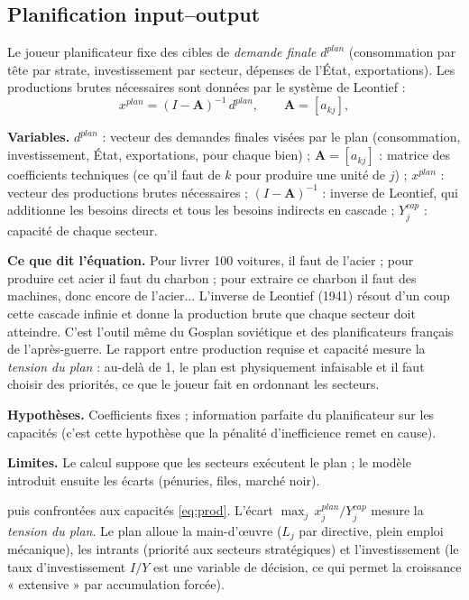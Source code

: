 \documentclass[11pt,a4paper]{article}
\newcommand{\og}{« }
\newcommand{\fg}{ »}
\newcommand{\variables}{\par\noindent\textbf{Variables.} }
\newcommand{\sens}{\par\noindent\textbf{Ce que dit l'équation.} }
\newcommand{\hyp}{\par\noindent\textbf{Hypothèses.} }
\newcommand{\limites}{\par\noindent\textbf{Limites.} }
\begin{document}
\subsection{Planification input--output}
\label{sec:plan}
Le joueur planificateur fixe des cibles de \emph{demande finale} $d^{plan}$ (consommation par tête par strate, investissement par secteur, dépenses de l'État, exportations). Les productions brutes nécessaires sont données par le système de Leontief :
\begin{equation}
x^{plan} = (I - \mathbf{A})^{-1}\, d^{plan}, \qquad \mathbf{A} = [a_{kj}],
\label{eq:leontief}
\end{equation}
\begin{lecture}
\variables $d^{plan}$ : vecteur des demandes finales visées par le plan (consommation, investissement, État, exportations, pour chaque bien) ; $\mathbf{A}=[a_{kj}]$ : matrice des coefficients techniques (ce qu'il faut de $k$ pour produire une unité de $j$) ; $x^{plan}$ : vecteur des productions brutes nécessaires ; $(I-\mathbf{A})^{-1}$ : inverse de Leontief, qui additionne les besoins directs et tous les besoins indirects en cascade ; $Y^{cap}_j$ : capacité de chaque secteur.
\sens Pour livrer 100 voitures, il faut de l'acier ; pour produire cet acier il faut du charbon ; pour extraire ce charbon il faut des machines, donc encore de l'acier... L'inverse de Leontief (1941) résout d'un coup cette cascade infinie et donne la production brute que chaque secteur doit atteindre. C'est l'outil même du Gosplan soviétique et des planificateurs français de l'après-guerre. Le rapport entre production requise et capacité mesure la \emph{tension du plan} : au-delà de 1, le plan est physiquement infaisable et il faut choisir des priorités, ce que le joueur fait en ordonnant les secteurs.
\hyp Coefficients fixes ; information parfaite du planificateur sur les capacités (c'est cette hypothèse que la pénalité d'inefficience remet en cause).
\limites Le calcul suppose que les secteurs exécutent le plan ; le modèle introduit ensuite les écarts (pénuries, files, marché noir).
\end{lecture}
puis confrontées aux capacités \eqref{eq:prod}. L'écart $\max_j\, x^{plan}_j / Y^{cap}_j$ mesure la \emph{tension du plan}. Le plan alloue la main-d'œuvre ($L_j$ par directive, plein emploi mécanique), les intrants (priorité aux secteurs stratégiques) et l'investissement (le taux d'investissement $I/Y$ est une variable de décision, ce qui permet la croissance \og extensive\fg{} par accumulation forcée).
\end{document}
